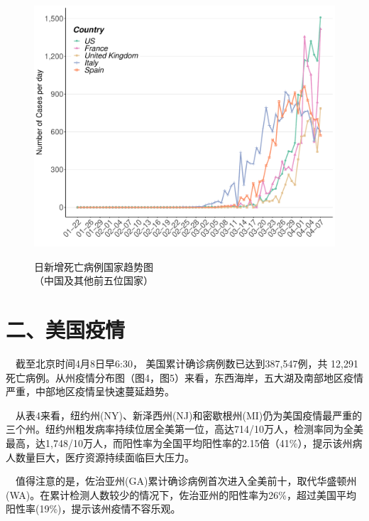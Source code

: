\documentclass[]{article}
\begin{document}
\begin{figure}[H]
\caption{日新增死亡病例国家趋势图 \\（中国及其他前五位国家）} %
\centering
\includegraphics[]{./input/covid3.pdf} 
\label{} %
\end{figure}

\newpage

\hypertarget{section-3}{%
\section{\texorpdfstring{\textcolor{glaucous}{\Huge 二、美国疫情}}{}}\label{section-3}}

\(\quad\)截至北京时间4月8日早6:30，
美国累计确诊病例数已达到387,547例，共 12,291
死亡病例。从州疫情分布图（图4，图5）来看，东西海岸，五大湖及南部地区疫情严重，中部地区疫情呈快速蔓延趋势。

\(\quad\)从表4来看，纽约州(NY)、新泽西州(NJ)和密歇根州(MI)仍为美国疫情最严重的三个州。纽约州粗发病率持续位居全美第一位，高达714/10万人，检测率同为全美最高，达1,748/10万人，而阳性率为全国平均阳性率的2.15倍（41\%），提示该州病人数量巨大，医疗资源持续面临巨大压力。

\(\quad\)值得注意的是，佐治亚州(GA)累计确诊病例首次进入全美前十，取代华盛顿州(WA)。在累计检测人数较少的情况下，佐治亚州的阳性率为26\%，超过美国平均阳性率(19\%)，提示该州疫情不容乐观。
\end{document}

